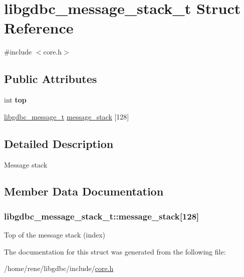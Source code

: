 \hypertarget{structlibgdbc__message__stack__t}{\section{libgdbc\-\_\-message\-\_\-stack\-\_\-t Struct Reference}
\label{structlibgdbc__message__stack__t}
}


{\ttfamily \#include $<$core.\-h$>$}

\subsection*{Public Attributes}
\begin{DoxyCompactItemize}
\item 
\hypertarget{structlibgdbc__message__stack__t_a193b564a0f3cb291e4225d61e0ae8d90}{int {\bfseries top}}\label{structlibgdbc__message__stack__t_a193b564a0f3cb291e4225d61e0ae8d90}

\item 
\hyperlink{structlibgdbc__message__t}{libgdbc\-\_\-message\-\_\-t} \hyperlink{structlibgdbc__message__stack__t_a373fc0a07c2547f8e1b9c520e4a8f48f}{message\-\_\-stack} \mbox{[}128\mbox{]}
\end{DoxyCompactItemize}


\subsection{Detailed Description}
Message stack 

\subsection{Member Data Documentation}
\hypertarget{structlibgdbc__message__stack__t_a373fc0a07c2547f8e1b9c520e4a8f48f}{
\subsubsection[{message\-\_\-stack}]{ libgdbc\-\_\-message\-\_\-stack\-\_\-t\-::message\-\_\-stack\mbox{[}128\mbox{]}}}\label{structlibgdbc__message__stack__t_a373fc0a07c2547f8e1b9c520e4a8f48f}
Top of the message stack (index) 

The documentation for this struct was generated from the following file\-:\begin{DoxyCompactItemize}
\item 
/home/rene/libgdbc/include/\hyperlink{core_8h}{core.\-h}\end{DoxyCompactItemize}
